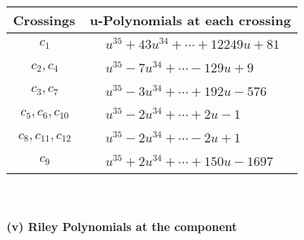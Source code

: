 \documentclass[1p]{elsarticle_modified}
\theoremstyle{definition}
\begin{document}
\begin{tabular}{m{50pt}|m{274pt}}
Crossings & \hspace{64pt}u-Polynomials at each crossing \\
\hline $$\begin{aligned}c_{1}\end{aligned}$$&$\begin{aligned}
&u^{35}+43 u^{34}+\cdots+12249 u+81
\end{aligned}$\\
\hline $$\begin{aligned}c_{2},c_{4}\end{aligned}$$&$\begin{aligned}
&u^{35}-7 u^{34}+\cdots-129 u+9
\end{aligned}$\\
\hline $$\begin{aligned}c_{3},c_{7}\end{aligned}$$&$\begin{aligned}
&u^{35}-3 u^{34}+\cdots+192 u-576
\end{aligned}$\\
\hline $$\begin{aligned}c_{5},c_{6},c_{10}\end{aligned}$$&$\begin{aligned}
&u^{35}-2 u^{34}+\cdots+2 u-1
\end{aligned}$\\
\hline $$\begin{aligned}c_{8},c_{11},c_{12}\end{aligned}$$&$\begin{aligned}
&u^{35}-2 u^{34}+\cdots-2 u+1
\end{aligned}$\\
\hline $$\begin{aligned}c_{9}\end{aligned}$$&$\begin{aligned}
&u^{35}+2 u^{34}+\cdots+150 u-1697
\end{aligned}$\\
\hline
\end{tabular}\\~\\
\newpage\renewcommand{\arraystretch}{1}
\flushleft \textbf{(v) Riley Polynomials at the component}\newline \\
\end{document}
